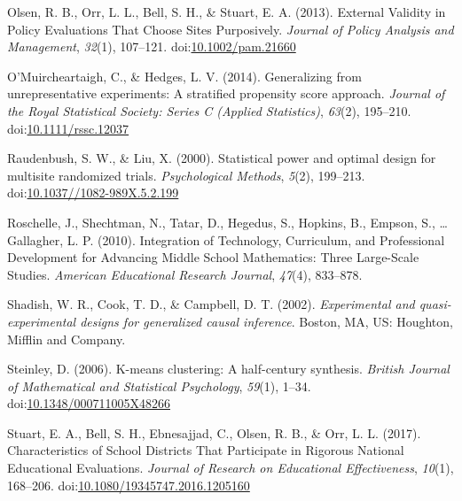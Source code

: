 \documentclass[man,floatsintext]{apa6}
\begin{document}
\leavevmode\hypertarget{ref-olsenExternalValidityPolicy2013}{}%
Olsen, R. B., Orr, L. L., Bell, S. H., \& Stuart, E. A. (2013). External Validity in Policy Evaluations That Choose Sites Purposively. \emph{Journal of Policy Analysis and Management}, \emph{32}(1), 107--121. doi:\href{https://doi.org/10.1002/pam.21660}{10.1002/pam.21660}

\leavevmode\hypertarget{ref-omuircheartaighGeneralizingUnrepresentativeExperiments2014}{}%
O'Muircheartaigh, C., \& Hedges, L. V. (2014). Generalizing from unrepresentative experiments: A stratified propensity score approach. \emph{Journal of the Royal Statistical Society: Series C (Applied Statistics)}, \emph{63}(2), 195--210. doi:\href{https://doi.org/10.1111/rssc.12037}{10.1111/rssc.12037}

\leavevmode\hypertarget{ref-raudenbushStatisticalPowerOptimal2000}{}%
Raudenbush, S. W., \& Liu, X. (2000). Statistical power and optimal design for multisite randomized trials. \emph{Psychological Methods}, \emph{5}(2), 199--213. doi:\href{https://doi.org/10.1037//1082-989X.5.2.199}{10.1037//1082-989X.5.2.199}

\leavevmode\hypertarget{ref-roschelleIntegrationTechnologyCurriculum2010}{}%
Roschelle, J., Shechtman, N., Tatar, D., Hegedus, S., Hopkins, B., Empson, S., \ldots{} Gallagher, L. P. (2010). Integration of Technology, Curriculum, and Professional Development for Advancing Middle School Mathematics: Three Large-Scale Studies. \emph{American Educational Research Journal}, \emph{47}(4), 833--878.

\leavevmode\hypertarget{ref-shadishExperimentalQuasiexperimentalDesigns2002}{}%
Shadish, W. R., Cook, T. D., \& Campbell, D. T. (2002). \emph{Experimental and quasi-experimental designs for generalized causal inference}. Boston, MA, US: Houghton, Mifflin and Company.

\leavevmode\hypertarget{ref-steinleyKmeansClusteringHalfcentury2006}{}%
Steinley, D. (2006). K-means clustering: A half-century synthesis. \emph{British Journal of Mathematical and Statistical Psychology}, \emph{59}(1), 1--34. doi:\href{https://doi.org/10.1348/000711005X48266}{10.1348/000711005X48266}

\leavevmode\hypertarget{ref-stuartCharacteristicsSchoolDistricts2017}{}%
Stuart, E. A., Bell, S. H., Ebnesajjad, C., Olsen, R. B., \& Orr, L. L. (2017). Characteristics of School Districts That Participate in Rigorous National Educational Evaluations. \emph{Journal of Research on Educational Effectiveness}, \emph{10}(1), 168--206. doi:\href{https://doi.org/10.1080/19345747.2016.1205160}{10.1080/19345747.2016.1205160}
\end{document}
